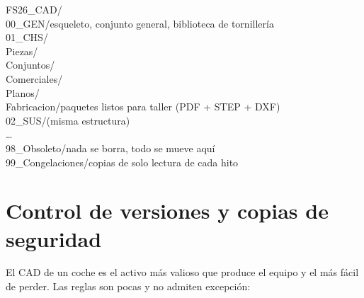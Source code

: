 \begin{center}
\begin{minipage}{0.8\textwidth}
\ttfamily\small
FS26\_CAD/\\
\hspace*{1em}00\_GEN/\quad esqueleto, conjunto general, biblioteca de tornillería\\
\hspace*{1em}01\_CHS/\\
\hspace*{2em}Piezas/\\
\hspace*{2em}Conjuntos/\\
\hspace*{2em}Comerciales/\\
\hspace*{2em}Planos/\\
\hspace*{2em}Fabricacion/\quad paquetes listos para taller (PDF + STEP + DXF)\\
\hspace*{1em}02\_SUS/\quad\textrm{(misma estructura)}\\
\hspace*{1em}\ldots\\
\hspace*{1em}98\_Obsoleto/\quad nada se borra, todo se mueve aquí\\
\hspace*{1em}99\_Congelaciones/\quad copias de solo lectura de cada hito
\end{minipage}
\end{center}

\section{Control de versiones y copias de seguridad}
\label{sec:herramientas_cad_datos:04}

El CAD de un coche es el activo más valioso que produce el equipo y el más fácil
de perder. Las reglas son pocas y no admiten excepción:


